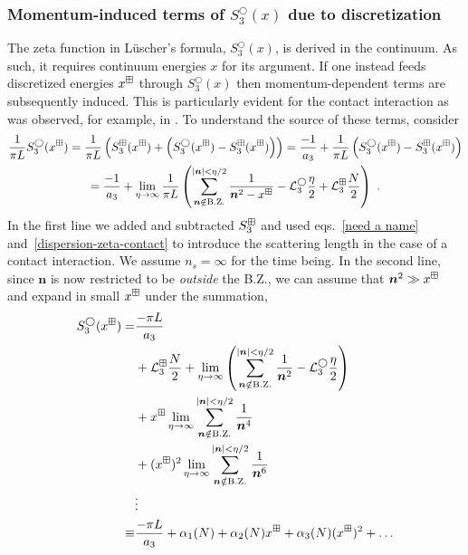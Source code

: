 

\subsubsection{Momentum-induced terms of $S^\bigcirc_3(x)$ due to discretization\label{sect:3d induced momenta}}
The zeta function in L\"uscher's formula, $S^\bigcirc_3(x)$, is derived in the continuum.  As such, it requires continuum energies $x$ for its argument.  If one instead feeds discretized energies $x^\boxplus$ through $S^\bigcirc_3(x)$ then momentum-dependent terms are subsequently induced.  This is particularly evident for the contact interaction as was observed, for example, in \cite{Endres:2012cw}.  To understand the source of these terms, consider
\begin{multline}
\frac{1}{\pi L}S^\bigcirc_3(x^\dispersion)=\frac{1}{\pi L}\left(S^{\dispersion}_3(x^\dispersion)+\left(S^\bigcirc_3(x^\dispersion)-S^{\dispersion}_3(x^\dispersion)\right)\right)=\frac{-1}{a_3}+\frac{1}{\pi L}\left(S^\bigcirc_3(x^\dispersion)-S^{\dispersion}_3(x^\dispersion)\right)\\
=\frac{-1}{a_3}+\lim_{\eta \to\infty}\frac{1}{\pi L}\left(\sum_{\bm n\notin \mathrm{B.Z.}}^{|\bm n|<\eta / 2} \frac{1}{\bm n^{2}-x^\dispersion}-\mathcal{L}^\bigcirc_3\frac{\eta}{2}+\mathcal{L}^\dispersion_3\frac{N}{2}\right)\ .
\end{multline}
In the first line we added and subtracted $S^\boxplus_3$ and used eqs.~\eqref{need a name} and~\eqref{dispersion-zeta-contact} to introduce the scattering length in the case of a contact interaction.  We assume $n_s=\infty$ for the time being.  In the second line, since $\bm n$ is now restricted to be \emph{outside} the B.Z., we can assume that $\bm n^2\gg x^\boxplus$ and expand in small $x^\boxplus$ under the summation,
\begin{align}
S^\bigcirc_3(x^\boxplus)=&\frac{-\pi L}{a_3}\label{eqn:observable}\\
&+\mathcal{L}^\boxplus_3\frac{N}{2}+\lim_{\eta \to\infty}\left(\sum_{\bm n\notin \mathrm{B.Z.}}^{|\bm n|<\eta / 2} \frac{1}{\bm n^{2}}-\mathcal{L}^\bigcirc_3\frac{\eta}{2}\right)\label{eqn:constant}\\
&+x^\boxplus\lim_{\eta \to\infty}\sum_{\bm n\notin \mathrm{B.Z.}}^{|\bm n|<\eta / 2} \frac{1}{\bm n^{4}}\label{eqn:range}\\
&+(x^\boxplus)^2\lim_{\eta \to\infty}\sum_{\bm n\notin \mathrm{B.Z.}}^{|\bm n|<\eta / 2} \frac{1}{\bm n^{6}}\label{eqn:shape}\\
&\vdots\\
\equiv& \frac{-\pi L}{a_3}+\alpha_1(N)+\alpha_2(N)x^\boxplus+\alpha_3(N)(x^\boxplus)^2+\ldots\label{eq:small x}
\end{align}
